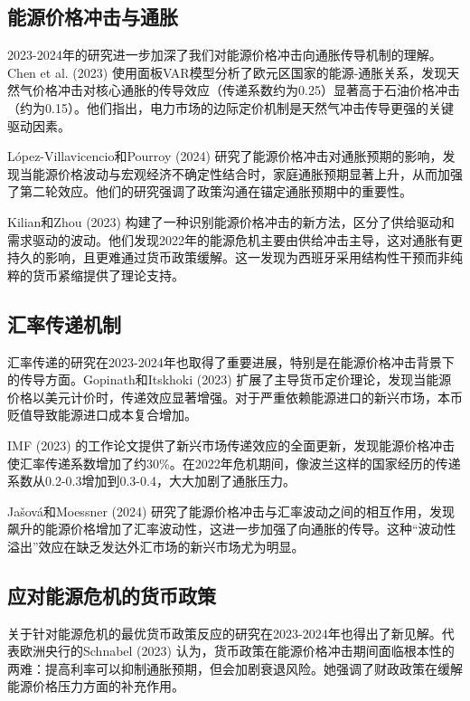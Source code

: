 \documentclass[12pt, a4paper]{article}
\begin{document}
\subsection{能源价格冲击与通胀}

2023-2024年的研究进一步加深了我们对能源价格冲击向通胀传导机制的理解。Chen et al. (2023) 使用面板VAR模型分析了欧元区国家的能源-通胀关系，发现天然气价格冲击对核心通胀的传导效应（传递系数约为0.25）显著高于石油价格冲击（约为0.15）。他们指出，电力市场的边际定价机制是天然气冲击传导更强的关键驱动因素。

L\'{o}pez-Villavicencio和Pourroy (2024) 研究了能源价格冲击对通胀预期的影响，发现当能源价格波动与宏观经济不确定性结合时，家庭通胀预期显著上升，从而加强了第二轮效应。他们的研究强调了政策沟通在锚定通胀预期中的重要性。

Kilian和Zhou (2023) 构建了一种识别能源价格冲击的新方法，区分了供给驱动和需求驱动的波动。他们发现2022年的能源危机主要由供给冲击主导，这对通胀有更持久的影响，且更难通过货币政策缓解。这一发现为西班牙采用结构性干预而非纯粹的货币紧缩提供了理论支持。


\subsection{汇率传递机制}

汇率传递的研究在2023-2024年也取得了重要进展，特别是在能源价格冲击背景下的传导方面。Gopinath和Itskhoki (2023) 扩展了主导货币定价理论，发现当能源价格以美元计价时，传递效应显著增强。对于严重依赖能源进口的新兴市场，本币贬值导致能源进口成本复合增加。

IMF (2023) 的工作论文提供了新兴市场传递效应的全面更新，发现能源价格冲击使汇率传递系数增加了约30\%。在2022年危机期间，像波兰这样的国家经历的传递系数从0.2-0.3增加到0.3-0.4，大大加剧了通胀压力。

Ja\v{s}ov\'{a}和Moessner (2024) 研究了能源价格冲击与汇率波动之间的相互作用，发现飙升的能源价格增加了汇率波动性，这进一步加强了向通胀的传导。这种“波动性溢出”效应在缺乏发达外汇市场的新兴市场尤为明显。


\subsection{应对能源危机的货币政策}

关于针对能源危机的最优货币政策反应的研究在2023-2024年也得出了新见解。代表欧洲央行的Schnabel (2023) 认为，货币政策在能源价格冲击期间面临根本性的两难：提高利率可以抑制通胀预期，但会加剧衰退风险。她强调了财政政策在缓解能源价格压力方面的补充作用。
\end{document}
